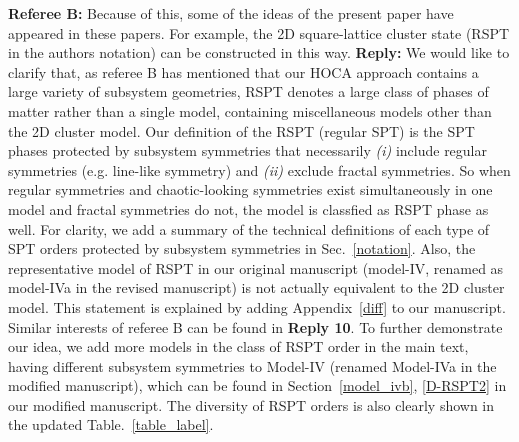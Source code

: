 \documentclass{article}
\begin{document}
\begin{tcolorbox}[title=Reply 5B (point-to-point reply), breakable]
\textbf{Referee B:}  Because of this, some of the ideas of the present paper have appeared in these papers. For example, the 2D square-lattice cluster state
(RSPT in the authors notation) can be constructed in this way.
\tcblower
\textbf{Reply:} We would like to clarify that, as referee B has mentioned that our HOCA approach contains a large variety of subsystem geometries, RSPT denotes a large class of phases of matter rather than a single model, containing miscellaneous models other than the 2D cluster model. Our definition of the RSPT (regular SPT) is the SPT phases protected by subsystem symmetries that necessarily \textit{(i)} include regular symmetries (e.g. line-like symmetry) and \textit{(ii)} exclude fractal symmetries. So when regular symmetries and chaotic-looking symmetries exist simultaneously in one model and fractal symmetries do not, the model is classfied as RSPT phase as well. For clarity, we add a summary of the technical definitions of each type of SPT orders protected by subsystem symmetries in Sec.~\ref{notation}. Also, the representative model of RSPT in our original manuscript (model-IV, renamed as model-IVa in the revised manuscript) is not actually equivalent to the 2D cluster model. This statement is explained by adding Appendix~\ref{diff} to our manuscript. Similar interests of referee B can be found in \textbf{Reply 10}. To further demonstrate our idea, we add more models in the class of RSPT order in the main text, having different subsystem symmetries to Model-IV (renamed Model-IVa in the modified manuscript), which can be found in Section~\ref{model_ivb}, \ref{D-RSPT2} in our modified manuscript. The diversity of RSPT orders is also clearly shown in the updated Table.~\ref{table_label}.
\end{tcolorbox}
\end{document}
